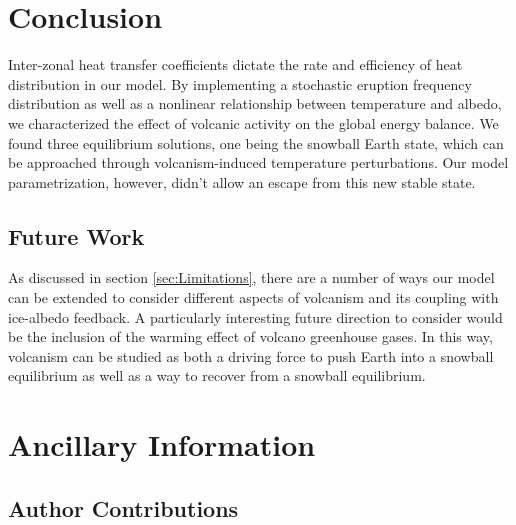 \documentclass[12pt]{article}
\begin{document}
\section{Conclusion}
Inter-zonal heat transfer coefficients dictate the rate and efficiency of heat
distribution in our model. By implementing a stochastic eruption frequency
distribution as well as a nonlinear relationship between temperature and albedo,
we characterized the effect of volcanic activity on the global energy balance.
We found three equilibrium solutions, one being the snowball Earth state,
which can be approached through volcanism-induced temperature perturbations.
Our model parametrization, however, didn’t allow an escape from this new stable
state.

\subsection{Future Work}
As discussed in section \ref{sec:Limitations}, there are a number of ways our model
can be extended to consider different aspects of volcanism and its coupling with
ice-albedo feedback. A particularly interesting future direction to
consider would be the inclusion of the warming effect of volcano greenhouse gases.
In this way, volcanism can be studied as both a driving force to push Earth into
a snowball equilibrium as well as a way to recover from a snowball equilibrium.

\section{Ancillary Information}
\subsection{Author Contributions}
\end{document}
